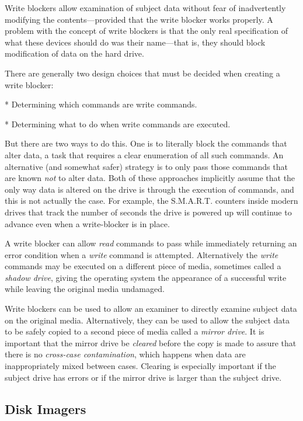 \documentclass[11pt,letter]{article}
\begin{document}
Write blockers allow examination of subject data without fear of
inadvertently modifying the contents---provided that the write blocker
works properly. A problem with the concept of write blockers is that
the only real specification of what these devices should do was their
name---that is, they should block modification of data on the hard
drive.  

There are generally two design choices that must be decided when
creating a write blocker:

* Determining which commands are write commands.

* Determining what to do when write commands are executed.

But there
are two ways to do this. One is to literally block the commands that
alter data, a task that requires a clear enumeration of all such
commands. An alternative (and somewhat safer) strategy is to only pass
those commands that are known \emph{not} to alter
data\cite{dfrws2006:JamesLyle}. Both of these approaches
implicitly assume that the only way data is altered on the drive is
through the execution of commands, and this is not actually the
case. For example, the S.M.A.R.T. counters inside modern drives that
track the number of seconds the drive is powered up will continue to
advance even when a write-blocker is in place.


A write blocker can allow \emph{read} commands
to pass while immediately returning an error condition when a
\emph{write} command is attempted. Alternatively the \emph{write}
commands may be executed on a different piece of media, sometimes
called a \emph{shadow drive}, giving the operating system the
appearance of a successful write while leaving the original media
undamaged.


Write blockers can be used to allow an examiner to directly examine
subject data on the original media. Alternatively, they can be used to allow the subject
data to be safely copied to a second piece of media called a
\emph{mirror drive}. It is important that the mirror drive be
\emph{cleared} before the copy is made to assure that there is no
\emph{cross-case contamination}, which happens when data are
inappropriately mixed between cases. Clearing is especially important
if the subject drive has errors or if the mirror drive is larger than
the subject drive.



\subsection{Disk Imagers}
\end{document}
